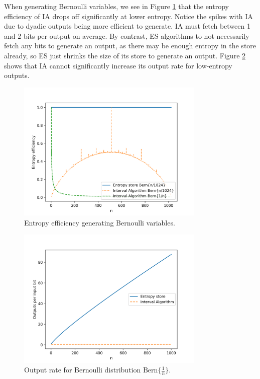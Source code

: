 \documentclass[12pt]{article}
\newcommand{\bern}[1]{\mathrm{Bern}\{#1\}}
\begin{document}
When generating Bernoulli variables, we see in Figure \ref{fig:bernoulli-efficiency} that the entropy efficiency of IA drops off significantly at lower entropy. Notice the spikes with IA due to dyadic outputs being more efficient to generate. IA must fetch between 1 and 2 bits per output on average. By contrast, ES algorithms to not necessarily fetch any bits to generate an output, as there may be enough entropy in the store already, so ES just shrinks the size of its store to generate an output. Figure \ref{fig:bernoulli-rate} shows that IA cannot significantly increase its output rate for low-entropy outputs.

\begin{figure}[ht]
\centering
\includegraphics[width=0.8\textwidth]{bernoulli_efficiency.png}
\caption{Entropy efficiency generating Bernoulli variables.}
\label{fig:bernoulli-efficiency}
\end{figure}

\begin{figure}[ht]
\centering
\includegraphics[width=0.8\textwidth]{bernoulli_rate.png}
\caption{Output rate for Bernoulli distribution $\bern{\frac{1}{n}}$.}
\label{fig:bernoulli-rate}
\end{figure}
\end{document}
